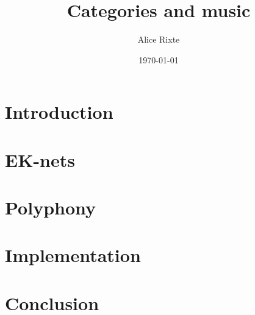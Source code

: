 \documentclass{report}
\begin{document}

\title{Categories and music}
\author{Alice Rixte}
\date{\today}
\maketitle %

\chapter{Introduction}


\chapter{EK-nets}


\chapter{Polyphony}


\chapter{Implementation}


\chapter{Conclusion}



\newpage


\end{document}
